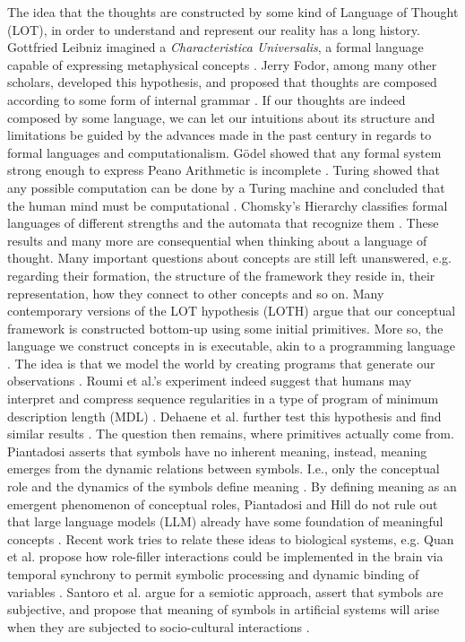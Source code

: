 The idea that the thoughts are constructed by some kind of Language of Thought (LOT), in order to understand and represent our reality has a long history. 
Gottfried Leibniz imagined a \textit{Characteristica Universalis}, a formal language capable of expressing metaphysical concepts \cite{sep-leibniz-logic-influence}.
Jerry Fodor, among many other scholars, developed this hypothesis, and proposed that thoughts are composed according to some form of internal grammar \cite{sep-language-thought}.
If our thoughts are indeed composed by some language, we can let our intuitions about its structure and limitations be guided by the advances made in the past century in regards to formal languages and computationalism.
Gödel showed that any formal system strong enough to express Peano Arithmetic is incomplete \cite{sep-goedel-incompleteness}. Turing showed that any possible computation can be done by a Turing machine and concluded that the human mind must be computational \cite{JCopeland2004-JCOTET}. Chomsky's Hierarchy classifies formal languages of different strengths and the automata that recognize them \cite{chomsky1959certain}.
These results and many more are consequential when thinking about a language of thought.
Many important questions about concepts are still left unanswered, e.g. regarding their formation, the structure of the framework they reside in, their representation, how they connect to other concepts and so on. 
Many contemporary versions of the LOT hypothesis (LOTH) argue that our conceptual framework is constructed bottom-up using some initial primitives. More so, the language we construct concepts in is executable, akin to a programming language \cite{dehaene_symbols_2022}. The idea is that we model the world by creating programs that generate our observations \cite{rule_child_2020}. 
Roumi et al.'s experiment indeed suggest that humans may interpret and compress sequence regularities in a type of program of minimum description length (MDL) \cite{al_roumi_mental_2021}.
Dehaene et al. further test this hypothesis and find similar results \cite{dehaene_symbols_2022}.
The question then remains, where primitives actually come from.
Piantadosi asserts that symbols have no inherent meaning, instead, meaning emerges from the dynamic relations between symbols. I.e., only the conceptual role and the dynamics of the symbols define meaning \cite{piantadosi2021computational}.
By defining meaning as an emergent phenomenon of conceptual roles, Piantadosi and Hill do not rule out that large language models (LLM) already have some foundation of meaningful concepts \cite{piantasodi2022meaning}.
Recent work tries to relate these ideas to biological systems, e.g. Quan et al. propose how role-filler interactions could be implemented in the brain via temporal synchrony to permit symbolic processing and dynamic binding of variables \cite{do2021neural}.
Santoro et al. argue for a semiotic approach, assert that symbols are subjective, and propose that meaning of symbols in artificial systems will arise when they are subjected to socio-cultural interactions \cite{santoro2021symbolic}.

